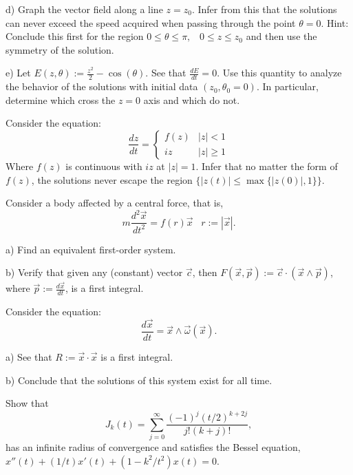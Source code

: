 d) Graph the vector field along a line $z=z_0$.
Infer from this that the solutions can never exceed the speed acquired when passing through the point $\theta=0$. Hint: Conclude this first for the
region $0 \leq \theta \leq \pi,\;\;\; 0 \leq z \leq z_0$ and then use the symmetry of the solution.

e) Let $E(z,\theta) := \frac{z^2}{2} - \cos(\theta)$. See that 
$\frac{dE}{dt} = 0$. Use this quantity to analyze the behavior
of the solutions with initial data $(z_0,\theta_0=0)$. In particular,
determine which cross the $z=0$ axis and which do not.
\epro

\bpro 
Consider the equation:
\begin{equation}
  \frac{dz}{dt} = \left\{
  \begin{array}{ll}
    f(z) & |z| < 1 \\
    iz   & |z| \geq 1
  \end{array}
  \right.
\end{equation}
Where $f(z)$ is continuous with $iz$ at $|z|=1$.
Infer that no matter the form of $f(z)$, the solutions
never escape the region $\{|z(t)| \leq \max\{|z(0)|, 1\}\}$.
\epro

\bpro 
Consider a body affected by a central force, that is,
\begin{equation}
  m\frac{d^2\vec{x}}{dt^2} = f(r)\vec{x}\;\;\; r:= |\vec{x}|.
\end{equation}
%

a) Find an equivalent first-order system.

b) Verify that given any (constant) vector $\vec{c}$, then
   $F(\vec{x},\vec{p}) := \vec{c}\cdot(\vec{x}\wedge \vec{p})$,
   where $\vec{p} := \frac{d\vec{x}}{dt}$, is a first integral.
\epro

\bpro 
Consider the equation:
\begin{equation}
  \frac{d\vec{x}}{dt} = \vec{x} \wedge \vec{\omega}(\vec{x}).
\end{equation}
%

a) See that $R:= \vec{x}\cdot\vec{x}$ is a first integral.

b) Conclude that the solutions of this system exist for all time.
\epro


\bpro[Strichartz]
Show that 
\begin{equation}
  \label{eq:Bessel}
  J_k(t) = \sum_{j=0}^{\infty} \frac{(-1)^j(t/2)^{k+2j}}{j!(k+j)!},
\end{equation}
%
has an infinite radius of convergence and satisfies the Bessel equation,
$x''(t) + (1/t)x'(t) + (1-k^2/t^2)x(t) = 0$.
\epro



